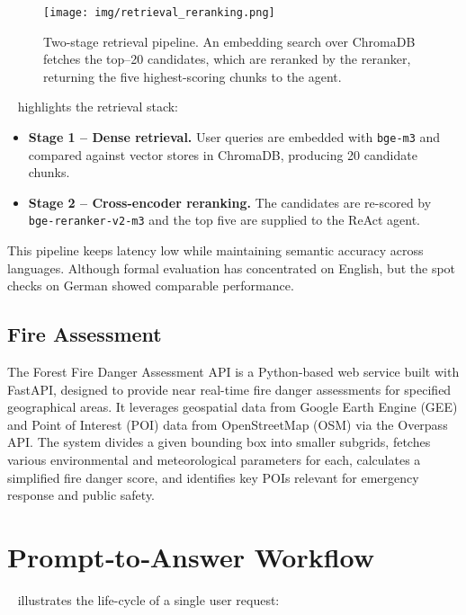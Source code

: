 \documentclass[lang=english,inputenc=utf8,fontsize=10pt]{ldvarticle}
\begin{document}
\begin{figure}[t]
  \centering
  \texttt{[image: img/retrieval\_reranking.png]}
  \caption{Two-stage retrieval pipeline.  An embedding search over
           ChromaDB fetches the top--20 candidates, which are reranked by
           the reranker, returning the five highest-scoring
           chunks to the agent.}
  \label{fig:retrieval}
\end{figure}

~ highlights the retrieval stack:

\begin{itemize}
  \item \textbf{Stage 1 – Dense retrieval.}  User queries are embedded
        with \texttt{bge-m3} and compared against vector stores in
        ChromaDB, producing 20 candidate chunks.
  \item \textbf{Stage 2 – Cross-encoder reranking.}  The candidates are
        re-scored by \texttt{bge-reranker-v2-m3} and the top five are supplied
        to the ReAct agent.
\end{itemize}

This pipeline keeps latency low while maintaining semantic accuracy across
languages. Although formal evaluation has concentrated on English, but the
spot checks on German showed comparable performance.

\subsection*{Fire Assessment}
The Forest Fire Danger Assessment API is a Python-based web service built with FastAPI, designed to provide near real-time fire danger assessments for specified geographical areas. It leverages geospatial data from Google Earth Engine (GEE) and Point of Interest (POI) data from OpenStreetMap (OSM) via the Overpass API. The system divides a given bounding box into smaller subgrids, fetches various environmental and meteorological parameters for each, calculates a simplified fire danger score, and identifies key POIs relevant for emergency response and public safety.


\section*{Prompt‐to‐Answer Workflow}
~ illustrates the life-cycle of a
single user request:
\end{document}
